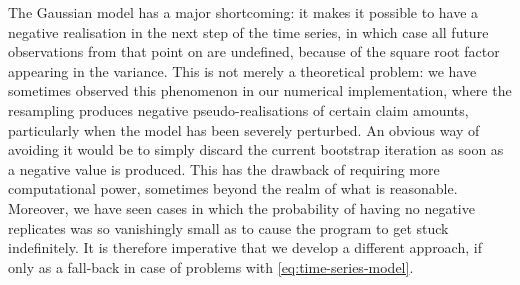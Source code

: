 \documentclass[a4paper]{book}
\begin{document}
The Gaussian model has a major shortcoming: it makes it possible to have a negative realisation in the next step of the time series, in which case all future observations from that point on are undefined, because of the square root factor appearing in the variance. This is not merely a theoretical problem: we have sometimes observed this phenomenon in our numerical implementation, where the resampling produces negative pseudo-realisations of certain claim amounts, particularly when the model has been severely perturbed. An obvious way of avoiding it would be to simply discard the current bootstrap iteration as soon as a negative value is produced. This has the drawback of requiring more computational power, sometimes beyond the realm of what is reasonable. Moreover, we have seen cases in which the probability of having no negative replicates was so vanishingly small as to cause the program to get stuck indefinitely. It is therefore imperative that we develop a different approach, if only as a fall-back in case of problems with \cref{eq:time-series-model}.
\end{document}
